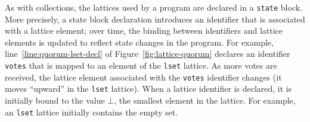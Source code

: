 As with collections, the lattices used by a \lang program are declared in a
\texttt{state} block. More precisely, a state block declaration introduces an
identifier that is associated with a lattice element; over time, the binding
between identifiers and lattice elements is updated to reflect state changes in
the program. For example, line~\ref{line:quorum-lset-decl} of
Figure~\ref{fig:lattice-quorum} declares an identifier \texttt{votes} that is
mapped to an element of the \texttt{lset} lattice. As more votes are received,
the lattice element associated with the \texttt{votes} identifier changes (it
moves ``upward'' in the \texttt{lset} lattice). When a lattice identifier is
declared, it is initially bound to the value $\bot$, the smallest element in the
lattice. For example, an \texttt{lset} lattice initially contains the empty set.

